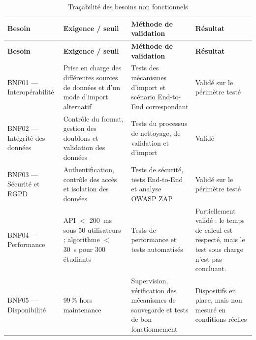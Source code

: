 \begin{longtable}{|p{2.6cm}|p{4.3cm}|p{4.3cm}|p{3.2cm}|}

\caption{Traçabilité des besoins non fonctionnels}
\label{tab:tracabilite-bnf} \\

\hline

\rowcolor{gray!20}

\textbf{Besoin} &
\textbf{Exigence / seuil} &
\textbf{Méthode de validation} &
\textbf{Résultat} \\

\hline

\endfirsthead

\hline

\rowcolor{gray!20}

\textbf{Besoin} &
\textbf{Exigence / seuil} &
\textbf{Méthode de validation} &
\textbf{Résultat} \\

\hline

\endhead

BNF01 --- Interopérabilité &
Prise en charge des différentes sources de données et d'un mode d'import alternatif &
Tests des mécanismes d'import et scénario End-to-End correspondant &
Validé sur le périmètre testé \\

\hline

BNF02 --- Intégrité des données &
Contrôle du format, gestion des doublons et validation des données &
Tests du processus de nettoyage, de validation et d'import &
Validé \\

\hline

BNF03 --- Sécurité et RGPD &
Authentification, contrôle des accès et isolation des données &
Tests de sécurité, tests End-to-End et analyse OWASP ZAP &
Validé sur le périmètre testé \\

\hline

BNF04 --- Performance &
API $<$ 200~ms sous 50 utilisateurs ; algorithme $<$ 30~s pour 300 étudiants &
Tests de performance et tests automatisés &
Partiellement validé : le temps de calcul est respecté, mais le test sous charge n'est pas concluant. \\

\hline

BNF05 --- Disponibilité &
99\,\% hors maintenance &
Supervision, vérification des mécanismes de sauvegarde et tests de bon fonctionnement &
Dispositifs en place, mais non mesuré en conditions réelles \\


\end{longtable}
